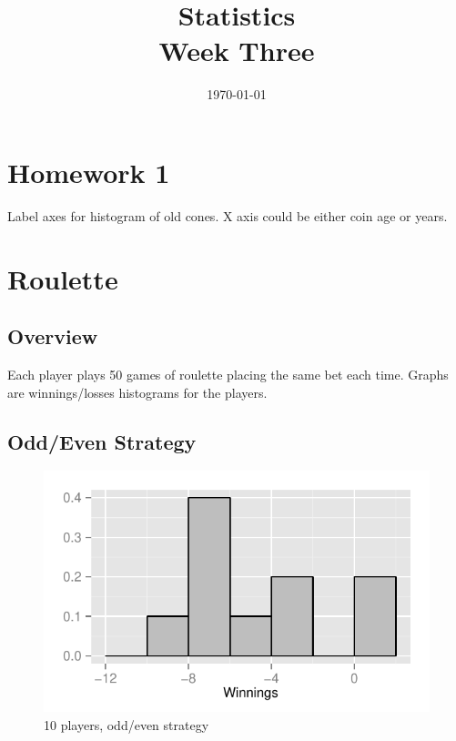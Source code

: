 \documentclass[landscape]{exam}
\author{}
\date{\today}
\title{Statistics \\ Week Three}
\begin{document}
  \maketitle
  \tableofcontents
  \section{Homework 1}

  Label axes for histogram of old cones. X axis could be either coin age or
  years.

  \section{Roulette}

  \subsection{Overview}

  Each player plays 50 games of roulette placing the same bet each time. Graphs
  are winnings/losses histograms for the players. 

  \subsection{Odd/Even Strategy} %
  
  \begin{figure}[H]
    \centering
    \includegraphics[scale = 0.9]{figures/roulette/18_10_50_fraction.pdf}
    \caption{10 players, odd/even strategy}
  \end{figure}
\end{document}
